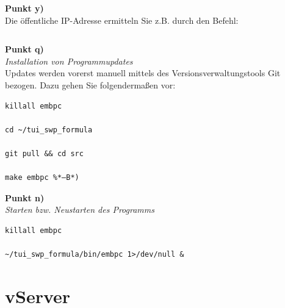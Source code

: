 \documentclass[fontsize = 12pt, paper = a4]{scrreprt}
\begin{document}
\vspace*{4mm}
\begin{lstlisting}[frame=single]
%*ssh root@192.168.0.2 –p22*)
\end{lstlisting} 
\vspace*{-2mm}

\textbf{Punkt y)} \\

Die öffentliche IP-Adresse ermitteln Sie z.B. durch den Befehl:	

\vspace*{4mm}
\begin{lstlisting}[frame=single]
%*curl http://ip.skittel.de*)
\end{lstlisting} 
\vspace*{-2mm}

\newpage

\textbf{Punkt q)} \\

\textit{Installation von Programmupdates} \\

Updates werden vorerst manuell mittels des Versionsverwaltungstools Git bezogen. Dazu gehen Sie folgendermaßen vor:

\vspace*{4mm}
\begin{lstlisting}[frame=single]
killall embpc

cd ~/tui_swp_formula

git pull && cd src

make embpc %*–B*)

\end{lstlisting} 
\vspace*{-2mm}

\textbf{Punkt n)} \\

\textit{Starten bzw. Neustarten des Programms} 

\vspace*{4mm}
\begin{lstlisting}[frame=single]
killall embpc

~/tui_swp_formula/bin/embpc 1>/dev/null &
\end{lstlisting} 
\vspace*{-2mm}





\section{vServer}
\end{document}
